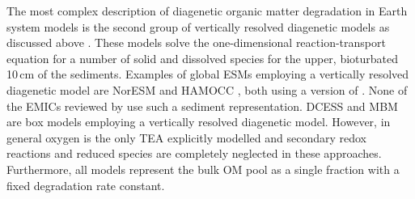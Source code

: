 \documentclass[gmd, manuscript]{copernicus}
\begin{document}
The most complex description of diagenetic organic matter degradation in Earth system models is the second group of vertically resolved diagenetic models as discussed above 
\citep[e.g.][]{heinze_global_1999, munhoven_glacialinterglacial_2007, shaffer_presentation_2008}. 
These models solve the one-dimensional reaction-transport equation for a number of solid and dissolved species for the upper, bioturbated 10\,cm of the sediments. 
Examples of global ESMs employing a vertically resolved diagenetic model are NorESM \citep{tjiputra_evaluation_2013} and HAMOCC \citep{palastanga_long_term_2011, ilyina_global_2013}, 
both using a version of \citet{heinze_global_1999}. None of the EMICs reviewed by \citet{hulse_understanding_2017} use such a sediment representation. 
DCESS \citep{shaffer_presentation_2008} and MBM \citep{munhoven_glacialinterglacial_2007} are box models employing a vertically resolved diagenetic model. 
However, in general oxygen is the only TEA explicitly modelled and secondary redox reactions and reduced species are completely neglected in these approaches. 
Furthermore, all models represent the bulk OM pool as a single fraction with a fixed degradation rate constant. 

\end{document}
